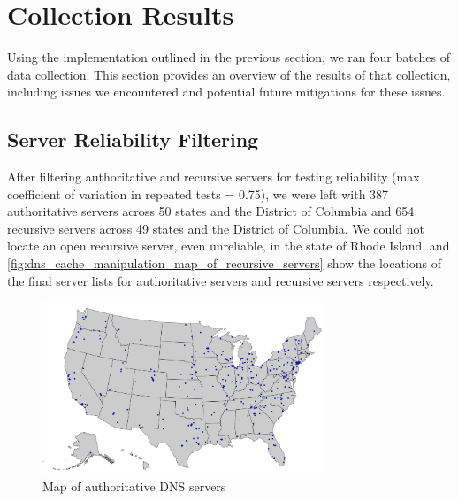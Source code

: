 \section{Collection Results}\label{sec:dns_results} %

Using the implementation outlined in the previous section, we ran four batches of data collection. This section provides an overview of the results of that collection, including issues we encountered and potential future mitigations for these issues.

\subsection{Server Reliability Filtering}

After filtering authoritative and recursive \dns servers for testing reliability (max coefficient of variation in repeated tests = 0.75), we were left with 387 authoritative servers across 50 states and the District of Columbia and 654 recursive servers across 49 states and the District of Columbia. We could not locate an open recursive \dns server, even unreliable, in the state of Rhode Island.  and \cref{fig:dns_cache_manipulation_map_of_recursive_servers} show the locations of the final server lists for authoritative servers and recursive servers respectively.

\begin{figure}[htb]
    \centering
    \includegraphics[width=0.75\textwidth]{images/dns/server_locations/auth_server_locations.png}
    \caption{Map of authoritative DNS servers}
    \label{fig:dns_cache_manipulation_map_of_authoritative_servers}
\end{figure}

